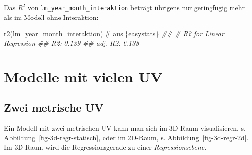 \documentclass[
  letterpaper,
  oneside,
  open=any]{scrbook}
\newenvironment{Shaded}{\begin{snugshade}}{\end{snugshade}}
\newcommand{\CommentTok}[1]{\textcolor[rgb]{0.37,0.37,0.37}{#1}}
\newcommand{\DocumentationTok}[1]{\textcolor[rgb]{0.37,0.37,0.37}{\textit{#1}}}
\newcommand{\FunctionTok}[1]{\textcolor[rgb]{0.28,0.35,0.67}{#1}}
\newcommand{\NormalTok}[1]{\textcolor[rgb]{0.00,0.23,0.31}{#1}}
\theoremstyle{definition}
\theoremstyle{definition}
\theoremstyle{definition}
\theoremstyle{remark}
\begin{document}
Das \(R^2\) von \texttt{lm\_year\_month\_interaktion} beträgt übrigens
nur geringfügig mehr als im Modell ohne Interaktion:

\begin{Shaded}
\begin{Highlighting}[]
\FunctionTok{r2}\NormalTok{(lm\_year\_month\_interaktion)  }\CommentTok{\# aus \textasciigrave{}\{easystats\}\textasciigrave{}}
\DocumentationTok{\#\# \# R2 for Linear Regression}
\DocumentationTok{\#\#        R2: 0.139}
\DocumentationTok{\#\#   adj. R2: 0.138}
\end{Highlighting}
\end{Shaded}

\section{Modelle mit vielen UV}\label{modelle-mit-vielen-uv}

\subsection{Zwei metrische UV}\label{zwei-metrische-uv}

Ein Modell mit zwei metrischen UV kann man sich im 3D-Raum
visualisieren, s. Abbildung~\ref{fig-3d-regr-statisch}, oder im 2D-Raum,
s. Abbildung~\ref{fig-3d-regr-2d}. Im 3D-Raum wird die Regressionsgerade
zu einer \emph{Regressionsebene.}
\end{document}
